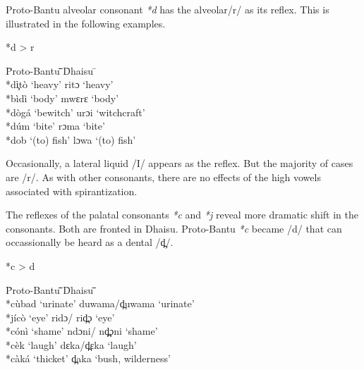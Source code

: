 \documentclass[output=paper,colorlinks,citecolor=brown]{langscibook}
\begin{document}
Proto-Bantu alveolar consonant \textit{*d} has the alveolar/r/ as its reflex. This is illustrated in the following examples. 

\ea%
    \label{ex:ngonyani:8}
    *d > r\\
    \begin{tabbing} 
        \= Proto-Bantu \quad\= \quad\= \quad\= \quad\= \quad\= \quad\= \quad\= Dhaisu \quad\=  \quad\= \\
        \> *dì̧tò
        \> ‘heavy’
        \> \> \>  \> \> \> ritɔ
        \> ‘heavy’\\
        
        \> *bìdì
        \> ‘body’
        \> \> \>  \> \> \> mwɛrɛ
        \> ‘body’\\
        
        \> *dògá
        \> ‘bewitch’
        \> \> \>  \> \> \> urɔi
        \> ‘witchcraft’\\
        
        \> *dúm
        \> ‘bite’
        \> \> \>  \> \> \> rɔma
        \> ‘bite’\\
        
        \> *dob
        \> ‘(to) fish’
        \> \> \>  \> \> \> lɔwa
        \> ‘(to) fish’
   \end{tabbing}
\z

Occasionally, a lateral liquid /I/ appears as the reflex. But the majority of cases are /r/. As with other consonants, there are no effects of the high vowels associated with spirantization.

The reflexes of the palatal consonants \textit{*c} and \textit{*j} reveal more dramatic shift in the consonants. Both are fronted in Dhaisu. Proto-Bantu \textit{*c} became /d/ that can occassionally be heard as a dental /d̪/.

\ea%
    \label{ex:ngonyani:9}
    *c > d\\
    \begin{tabbing} 
        \= Proto-Bantu \quad\= \quad\= \quad\= \quad\= \quad\= \quad\= \quad\= Dhaisu \quad\=  \quad\= \quad\= \quad\= \quad\=\\
     
        \> *cùbad
        \> ‘urinate’
        \> \> \>  \> \> \> duwama/d̪uwama
        \> \> \> \> \>  ‘urinate’\\
        
        \> *jícò
        \> ‘eye’
        \> \> \>  \> \> \> ridɔ/ rid̪ɔ
        \> \> \> \> \> ‘eye’\\
        
        \> *cónì
        \> ‘shame’
        \> \> \>  \> \> \> ndɔni/ nd̪̪ɔni
        \> \> \> \> \> ‘shame’\\
        
        \> *cèk
        \> ‘laugh’
        \> \> \>  \> \> \> dɛka/d̪ɛka
        \> \> \> \> \> ‘laugh’\\
        
        \> *càká
        \> ‘thicket’
        \> \> \>  \> \> \> d̪aka
        \> \> \> \> \> ‘bush, wilderness’
    \end{tabbing}
\z
\end{document}
